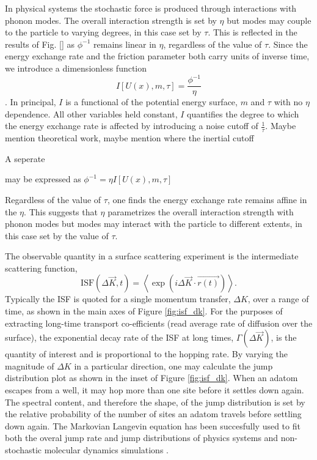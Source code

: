 \documentclass[7pt]{article}
\begin{document}
In physical systems the stochastic force is produced through interactions with phonon modes. The overall interaction strength is set by $\eta$ but modes may couple to the particle to varying degrees, in this case set by $\tau$. This is reflected in the results of Fig. \ref{} as $\phi^{-1}$ remains linear in $\eta$, regardless of the value of $\tau$. Since the energy exchange rate and the friction parameter both carry units of inverse time, we introduce a dimensionless function $$I[U(x), m, \tau] = \frac{\phi^{-1}}{\eta}$$. In principal, $I$ is a functional of the potential energy surface, $m$ and $\tau$ with no $\eta$ dependence. All other variables held constant, $I$ quantifies the degree to which the energy exchange rate is affected by introducing a noise cutoff of $\frac{1}{\tau}$. Maybe mention theoretical work, maybe mention where the inertial cutoff

A seperate  


 may be expressed as $\phi^{-1}=\eta I[U(x), m, \tau]$


 
Regardless of the value of $\tau$, one finds the energy exchange rate remains affine in the $\eta$. This suggests that $\eta$ parametrizes the overall interaction strength with phonon modes but modes may interact with the particle to different extents, in this case set by the value of $\tau$.

The observable quantity in a surface scattering experiment is the intermediate scattering function,
$$
\mathrm{ISF}(\Delta{\vec{K}}, t) = \left<\exp\left(i\Delta{\vec{K}}\cdot\vec{r(t)}\right)\right>.
$$
Typically the ISF is quoted for a single momentum transfer, $\Delta{K}$, over a range of time, as shown in the main axes of Figure \ref{fig:isf_dk}. For the purposes of extracting long-time transport co-efficients (read average rate of diffusion over the surface), the exponential decay rate of the ISF at long times, $\Gamma(\Delta{\vec{K}})$, is the quantity of interest and is proportional to the hopping rate\cite{Chudley}. By varying the magnitude of $\Delta{K}$ in a particular direction, one may calculate the jump distribution plot as shown in the inset of Figure \ref{fig:isf_dk}. When an adatom escapes from a well, it may hop more than one site before it settles down again. The spectral content, and therefore the shape, of the jump distribution is set by the relative probability of the number of sites an adatom travels before settling down again. The Markovian Langevin equation has been succesfully used to fit both the overal jump rate and jump distributions of physics systems \cite{Alexandrowicz, Hedgeland, Jardine} and non-stochastic molecular dynamics simulations \cite{Diamant}. 
\end{document}

